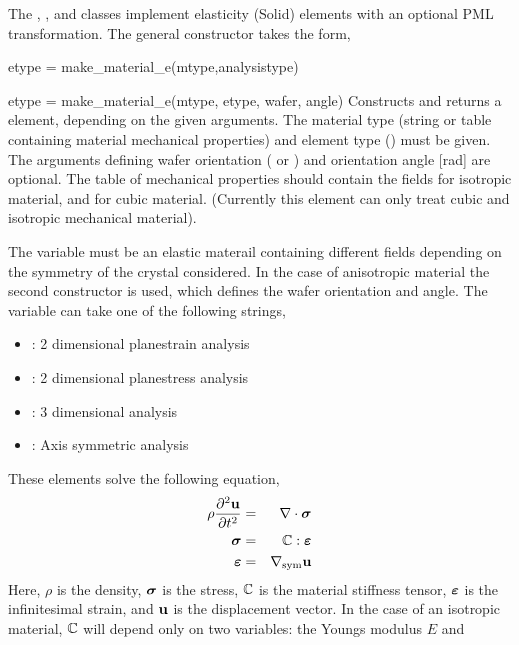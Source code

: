 The , , and 
classes implement elasticity (Solid) elements with an optional PML
transformation. 
The general constructor takes the form,
\begin{codelist}
  \item[etype = make\_material\_e(mtype,analysistype)]
  \item[etype = make\_material\_e(mtype, etype, wafer, angle)]
    Constructs and returns a  element, depending on the
    given arguments. The material type  (string or table containing
    material mechanical properties) and element type
    () must be given. 
    The arguments defining wafer orientation ( or
    ) and orientation angle  [rad] are optional.
    The table of mechanical properties  should contain the 
    fields  for isotropic material, and  for cubic material.
    (Currently this element can only treat cubic and isotropic mechanical
     material).
\end{codelist}
The variable  must be an elastic materail containing
different fields depending on the symmetry of the crystal considered.
In the case of anisotropic material the second constructor is used,
which defines the wafer orientation and angle.
The variable  can take one of the 
following strings,
\begin{itemize}
\item {}: 2 dimensional planestrain analysis
\item {}: 2 dimensional planestress analysis
\item {}: 3 dimensional analysis
\item {}: Axis symmetric analysis
\end{itemize}
These elements solve the following equation,
\begin{eqnarray}
\rho \frac{\partial^2 \mathbf{u}}{\partial t^2}
&=& \mathbf{\nabla}\cdot\boldsymbol{\sigma} \\
\boldsymbol{\sigma} &=& \mathbb{C}:\boldsymbol{\varepsilon} \\
\boldsymbol{\varepsilon} &=& \mathbf{\nabla}_\text{sym}\mathbf{u}
\end{eqnarray}
Here, $\rho$ is the density, $\boldsymbol{\sigma}$ is the stress, $\mathbb{C}$ is the
material stiffness tensor, $\boldsymbol{\varepsilon}$ is the infinitesimal strain, and
$\mathbf{u}$ is the displacement vector. In the case of an isotropic material,
$\mathbb{C}$ will depend only on two variables: the Youngs modulus $E$ and 
